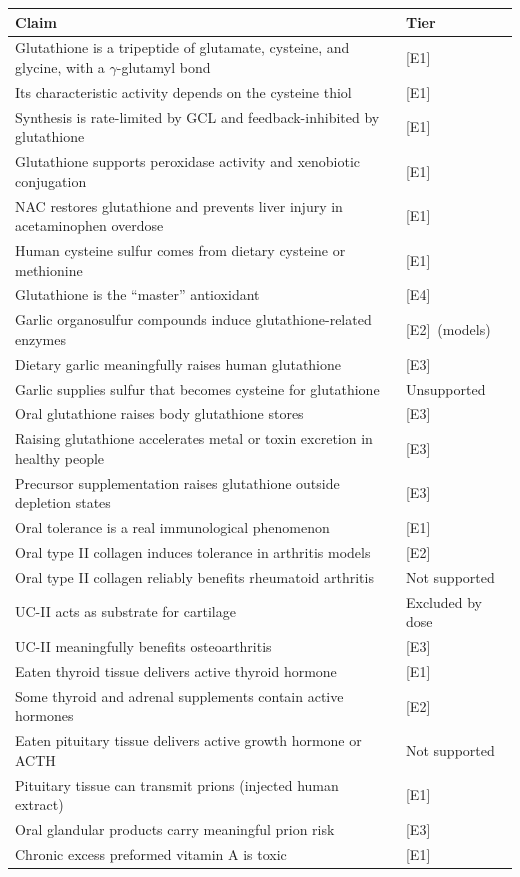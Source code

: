 \documentclass[11pt,a4paper]{article}
\theoremstyle{plain}
\theoremstyle{definition}
\theoremstyle{remark}
\newcommand{\tier}[1]{\textup{\textsc{[#1]}}}
\newcommand{\Eone}{\tier{E1}}
\newcommand{\Etwo}{\tier{E2}}
\newcommand{\Ethree}{\tier{E3}}
\newcommand{\Efour}{\tier{E4}}
\begin{document}
\begin{center}
\small
\begin{tabularx}{\textwidth}{@{}>{\raggedright\arraybackslash}X l@{}}
\toprule
\textbf{Claim} & \textbf{Tier} \\
\midrule
Glutathione is a tripeptide of glutamate, cysteine, and glycine, with a $\gamma$-glutamyl bond & \Eone \\
Its characteristic activity depends on the cysteine thiol & \Eone \\
Synthesis is rate-limited by GCL and feedback-inhibited by glutathione & \Eone \\
Glutathione supports peroxidase activity and xenobiotic conjugation & \Eone \\
NAC restores glutathione and prevents liver injury in acetaminophen overdose & \Eone \\
Human cysteine sulfur comes from dietary cysteine or methionine & \Eone \\
Glutathione is the ``master'' antioxidant & \Efour \\
Garlic organosulfur compounds induce glutathione-related enzymes & \Etwo\ (models) \\
Dietary garlic meaningfully raises human glutathione & \Ethree \\
Garlic supplies sulfur that becomes cysteine for glutathione & Unsupported \\
Oral glutathione raises body glutathione stores & \Ethree \\
Raising glutathione accelerates metal or toxin excretion in healthy people & \Ethree \\
Precursor supplementation raises glutathione outside depletion states & \Ethree \\
\midrule
Oral tolerance is a real immunological phenomenon & \Eone \\
Oral type II collagen induces tolerance in arthritis models & \Etwo \\
Oral type II collagen reliably benefits rheumatoid arthritis & Not supported \\
UC-II acts as substrate for cartilage & Excluded by dose \\
UC-II meaningfully benefits osteoarthritis & \Ethree \\
\midrule
Eaten thyroid tissue delivers active thyroid hormone & \Eone \\
Some thyroid and adrenal supplements contain active hormones & \Etwo \\
Eaten pituitary tissue delivers active growth hormone or ACTH & Not supported \\
Pituitary tissue can transmit prions (injected human extract) & \Eone \\
Oral glandular products carry meaningful prion risk & \Ethree \\
Chronic excess preformed vitamin A is toxic & \Eone \\
\bottomrule
\end{tabularx}
\end{center}
\end{document}
